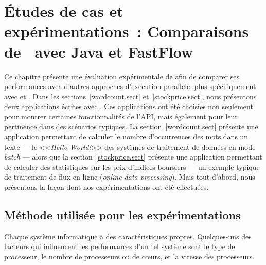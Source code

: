 
\chapter{\'Etudes de cas et exp\'erimentations~: Comparaisons de \ppff\ avec Java et FastFlow}
\label{experiences.chap}



Ce chapitre pr\'esente une \'evaluation exp\'erimentale de  afin de comparer ses performances avec d'autres approches d'ex\'ecution parall\`ele, plus sp\'ecifiquement avec  et .
%
Dans les sections~\ref{wordcount.sect} et~\ref{stockprice.sect}, nous pr\'esentons deux applications \'ecrites avec \PpFf. Ces applications ont \'et\'e choisies non seulement pour montrer certaines fonctionnalit\'es de l'API, mais \'egalement pour leur pertinence dans des sc\'enarios typiques. La section~\ref{wordcount.sect} pr\'esente une application permettant de calculer le nombre d'occurrences des mots dans un texte --- le <<\emph{Hello World!}>> des syst\`emes de traitement de donn\'ees en mode \emph{batch} --- alors que la section~\ref{stockprice.sect} pr\'esente une application permettant de calculer des statistiques sur les prix d'indices boursiers --- un exemple typique de traitement de flux en ligne (\emph{online data processing}). Mais tout d'abord, nous pr\'esentons la fa\c{c}on dont nos exp\'erimentations ont \'et\'e effectu\'ees.




\section{M\'ethode utilis\'ee pour les exp\'erimentations}
\label{usedMethodsForBenchmarks.chap}

Chaque syst\`eme informatique a des caract\'eristiques propres. Quelques-uns des facteurs qui influencent les performances d'un tel syst\`eme sont le type de processeur, le nombre de processeurs ou de c\oe{}urs, et la vitesse des processeurs. 


